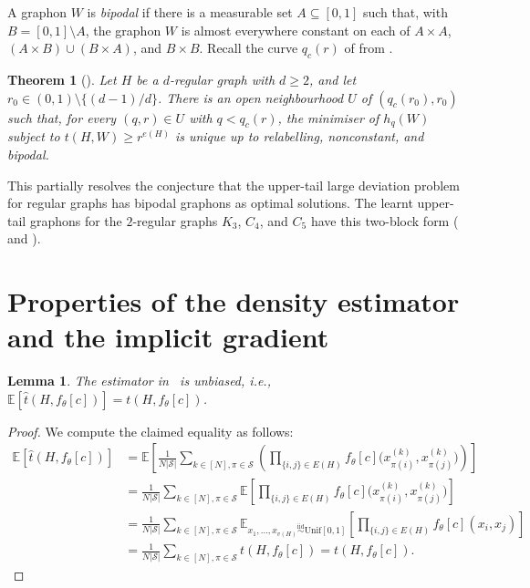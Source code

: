 \documentclass[11pt]{article}
\theoremstyle{plain}
\newtheorem{theorem}{Theorem}[section]
\newtheorem{lemma}{Lemma}[section]
\theoremstyle{definition}
\theoremstyle{remark}
\begin{document}
A graphon $W$ is \emph{bipodal} if there is a measurable set $A \subseteq [0,1]$ such that, with $B = [0,1] \setminus A$, the graphon $W$ is almost everywhere constant on each of $A \times A$, $(A \times B) \cup (B \times A)$, and $B \times B$. Recall the curve $q_c(r)$ of \citet{lubetzky2015replica} from .
\begin{theorem}[{\citealp[Theorem~1.5]{lim2026bipodal}}]\label{thm:bipodal}
Let $H$ be a $d$-regular graph with $d \ge 2$, and let $r_0 \in (0,1) \setminus \{(d-1)/d\}$. There is an open neighbourhood $U$ of $(q_c(r_0), r_0)$ such that, for every $(q, r) \in U$ with $q < q_c(r)$, the minimiser of $h_q(W)$ subject to $t(H, W) \ge r^{e(H)}$ is unique up to relabelling, nonconstant, and bipodal.
\end{theorem}
This partially resolves the conjecture that the upper-tail large deviation problem for regular graphs has bipodal graphons as optimal solutions. The learnt upper-tail graphons for the $2$-regular graphs $K_3$, $C_4$, and $C_5$ have this two-block form ( and ).

\section{Properties of the density estimator and the implicit gradient}

\begin{lemma} \label{lem:unbiased}
The estimator in~ is unbiased, i.e., $\mathbb{E}[\widehat{t}(H,f_\theta[c])] = t(H,f_\theta[c])$.
\end{lemma}
\begin{proof}[Proof]
We compute the claimed equality as follows:
\begin{align*}
\mathbb{E}\left[\widehat{t}(H, f_\theta{[c]})\right]
& {} =
\mathbb{E}\left[\frac{1}{N|\mathcal{S}|} \sum_{k \in [N], \pi \in \mathcal{S}} \left(\prod_{\{i, j\} \in E(H)} f_\theta[c]\Big(x_{\pi(i)}^{(k)}, x_{\pi(j)}^{(k)}\Big)\right)\right]
\\
& {} =
\frac{1}{N|\mathcal{S}|} \sum_{k \in [N], \pi \in \mathcal{S}}
\mathbb{E}\left[\prod_{\{i, j\} \in E(H)} f_\theta[c]\Big(x_{\pi(i)}^{(k)}, x_{\pi(j)}^{(k)}\Big)\right]
\\
& {} =
\frac{1}{N|\mathcal{S}|} \sum_{k \in [N], \pi \in \mathcal{S}}
\mathbb{E}_{x_1,\ldots,x_{v(H)} \stackrel{\mathrm{iid}}{\sim}\mathrm{Unif}[0,1]}\left[\prod_{\{i, j\} \in E(H)} f_\theta[c](x_i, x_j)\right]
\\
& {} =
\frac{1}{N{|\mathcal{S}|}}
\sum_{k \in [N], \pi \in \mathcal{S}} t(H,f_\theta{[c]}) = t(H,f_\theta{[c]}).
\end{align*}
\end{proof}
\end{document}
